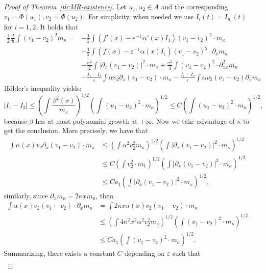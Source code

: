 \documentclass[onefignum,onetabnum]{siamart190516}
\newcommand{\1}{\mathbbm{1}}
\newcommand{\eps}{\varepsilon}
\begin{document}
\begin{proof}[Proof of Theorem~\ref{th:MR-existence}]
Let $u_1,u_2\in A$ and the corresponding $v_1=\Phi(u_1), v_2=\Phi(u_2)$. For simplicity, when needed we use $I_i(t)=I_{u_i}(t)$ for $i=1,2$. It holds that
\begin{align*}
\frac12\frac{d}{dt}\int(v_1-v_2)^2 {m_\kappa}=&-\frac12\int \left(f'(x)-\eps^{-1}\alpha'(x)I_1 \right)(v_1-v_2)^2\cdot {m_\kappa}
\\
&
+\frac12\int \left(f(x)-\eps^{-1}\alpha(x)I_1 \right)(v_1-v_2)^2\cdot \partial_x{m_\kappa}\\
&-\frac{\sigma^2}{2}\int |\partial_{x}(v_1-v_2)|^2\cdot {m_\kappa}+\frac{\sigma^2}{4}\int (v_1-v_2)^2\cdot \partial^2_{xx}{m_\kappa}
\\
&-\frac{I_1-I_2}{\eps}\int \alpha v_2\partial_x(v_1-v_2)\cdot {m_\kappa}-\frac{I_1-I_2}{\eps}\int\alpha v_2(v_1-v_2)\partial_x{m_\kappa}
\end{align*}
H\"older's inequality yields:
$$
|I_1-I_2| \leq \left(\int\frac{\beta^2(x)}{m_\kappa}\right)^{1/2}\left(\int (u_1-u_2)^2\cdot {m_\kappa}\right)^{1/2}\leq C\left(\int (u_1-u_2)^2\cdot {m_\kappa}\right)^{1/2},
$$
because $\beta$ has at most polynomial growth at $\pm\infty$. Now we take advantage of $\kappa$ to get the conclusion. More precisely, we have that
\begin{align*}
\int \alpha(x)v_2\partial_x(v_1-v_2)\cdot{m_\kappa}&\leq \left(\int \alpha^2v_2^2m_\kappa\right)^{1/2}\left(\int |\partial_x(v_1-v_2)|^2\cdot {m_\kappa}\right)^{1/2}
\\
&\leq C \left(\int v_2^2\cdot m_1\right)^{1/2}\left(\int |\partial_x(v_1-v_2)|^2\cdot {m_\kappa}\right)^{1/2}
\\
&\leq Ca_1\left(\int |\partial_x(v_1-v_2)|^2\cdot {m_\kappa}\right)^{1/2},
\end{align*}
similarly, since $\partial_xm_\kappa=2\kappa xm_\kappa$, then
\begin{align*}
\int \alpha(x)v_2(v_1-v_2)\cdot\partial_x{m_\kappa}&=
\int 2\kappa x\alpha(x)v_2(v_1-v_2)\cdot {m_\kappa}&
\\
&\leq \left(\int 4\kappa^2x^2\alpha^2v_2^2m_\kappa\right)^{1/2}\left(\int (v_1-v_2)^2\cdot {m_\kappa}\right)^{1/2}
\\
&\leq Ca_1\left(\int (v_1-v_2)^2\cdot {m_\kappa}\right)^{1/2}.
\end{align*}
Summarizing, there exists a constant $C$ depending on $\eps$ such that
\begin{align*}

\end{align*}
\end{proof}
\end{document}
